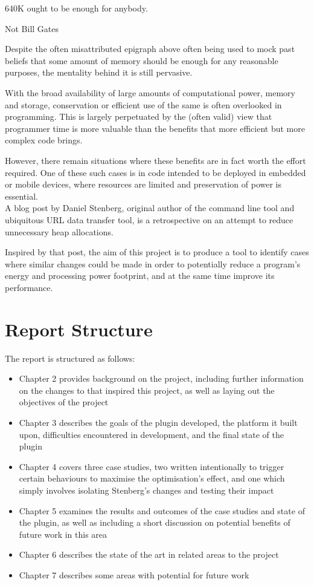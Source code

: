 \epigraph{640K ought to be enough for anybody.}{Not Bill Gates}

Despite the often misattributed epigraph above often being used to mock past beliefs that some amount of memory should be enough for any reasonable purposes, the mentality behind it is still pervasive.

With the broad availability of large amounts of computational power, memory and storage, conservation or efficient use of the same is often overlooked in programming. This is largely perpetuated by the (often valid) view that programmer time is more valuable than the benefits that more efficient but more complex code brings.

However, there remain situations where these benefits are in fact worth the effort required. One of these such cases is in code intended to be deployed in embedded or mobile devices, where resources are limited and preservation of power is essential. \\
A blog post \cite{curlmalloc} by Daniel Stenberg, original author of the  command line tool and ubiquitous URL data transfer tool, is a retrospective on an attempt to reduce unnecessary heap allocations.

Inspired by that post, the aim of this project is to produce a tool to identify cases where similar changes could be made in order to potentially reduce a program's energy and processing power footprint, and at the same time improve its performance.

\section{Report Structure}

The report is structured as follows:

\begin{itemize}
	\item{Chapter 2 provides background on the project, including further information on the changes to  that inspired this project, as well as laying out the objectives of the project}
	\item{Chapter 3 describes the goals of the plugin developed, the platform it built upon, difficulties encountered in development, and the final state of the plugin}
	\item{Chapter 4 covers three case studies, two written intentionally to trigger certain behaviours to maximise the optimisation's effect, and one which simply involves isolating Stenberg's changes and testing their impact}
	\item{Chapter 5 examines the results and outcomes of the case studies and state of the plugin, as well as including a short discussion on potential benefits of future work in this area}
	\item{Chapter 6 describes the state of the art in related areas to the project}
	\item{Chapter 7 describes some areas with potential for future work}
\end{itemize}
